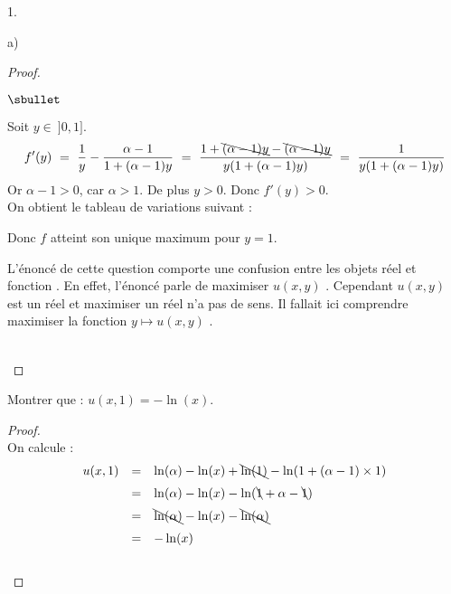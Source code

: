 \begin{noliste}{1.}
\begin{noliste}{a)}
\begin{proof}
\begin{noliste}{$\sbullet$}
	
	\item Soit $y \in \ ]0,1]$.
	\[
	  f'(y) \ = \ \dfrac{1}{y} - \dfrac{\alpha -1}{1+(\alpha-1)y}
	  \ = \ \dfrac{1+\bcancel{(\alpha-1)y} - \bcancel{(\alpha 
	  -1)y}}{y(1+(\alpha-1)y)} \ = \
	  \dfrac{1}{y (1+ (\alpha-1)y)}
	\]
	Or $\alpha-1 >0$, car $\alpha >1$. De plus $y>0$. Donc 
	$f'(y)>0$.\\
	On obtient le tableau de variations suivant :
	\begin{center}
      \end{center}
	Donc $f$ atteint son unique maximum pour $y=1$.
      \end{noliste}
      
      \begin{remarkL}{.98}
        L'énoncé de cette question  comporte  une confusion 
	entre les objets 
	\og réel \fg{} et \og fonction \fg{}.
	En effet, l'énoncé parle de \og maximiser $u(x,y)$ \fg{}.
	Cependant $u(x,y)$ est un réel et \og maximiser un réel \fg{}
	n'a pas de sens.
	Il fallait ici comprendre \og maximiser la fonction $y
	\mapsto u(x,y)$ \fg{}.
      \end{remarkL}~\\[-1.4cm]
    \end{proof}
    
    \item Montrer que : $u(x,1)=-\ln(x)$.
    
    \begin{proof}~\\
      On calcule :
      \[
        \begin{array}{rcl}
          u(x,1) &=& \ln(\alpha) - \ln(x) + \bcancel{\ln(1)} - 
          \ln(1+(\alpha -1) \times 1)
          \\[.2cm]
          &=& \ln(\alpha) - \ln(x) - \ln(\bcancel{1} + \alpha -
          \bcancel{1})
          \\[.2cm]
          &=& \bcancel{\ln(\alpha)} - \ln(x) - \bcancel{\ln(\alpha)}
          \\[.2cm]
          &=& - \ln(x)
        \end{array}
      \]
      ~\\[-1cm]
    \end{proof}
  \end{noliste}
  

\end{noliste}

